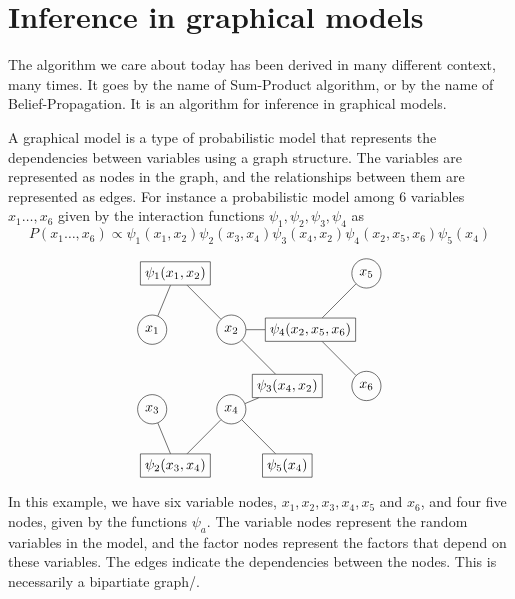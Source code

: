 \section{Inference in graphical models}

The algorithm we care about today has been derived in many different context, many times. It goes by the name of Sum-Product algorithm, or by the name of Belief-Propagation. It is an algorithm for inference in graphical models.

A graphical model is a type of probabilistic model that represents the dependencies between variables using a graph structure. The variables are represented as nodes in the graph, and the relationships between them are represented as edges. For instance a probabilistic model among 6 variables $x_1\ldots,x_6$ given by the interaction functions $\psi_1,\psi_2,\psi_3,\psi_4$ as
\[ P(x_1\ldots,x_6) \propto  \psi_1(x_1, x_2) \psi_2(x_3, x_4) \psi_3(x_4, x_2) \psi_4(x_2, x_5,x_6) \psi_5(x_4)\]

\[
\begin{tikzpicture}[node distance=2cm]
  \node[draw, circle] (x1) {$x_1$};
  \node[draw, circle, right of=x1] (x2) {$x_2$};
  \node[draw, rectangle, right of=x2] (f4) {$\psi_4(x_2, x_5,x_6)$};
  \node[draw, circle, above right of=f4] (x5) {$x_5$};
  \node[draw, circle, below right of=f4] (x6) {$x_6$};
  \node[draw, circle, below of=x1] (x3) {$x_3$};
  \node[draw, circle, below of=x2] (x4) {$x_4$};
  \node[draw, rectangle, above left of=x2] (f1) {$\psi_1(x_1, x_2)$};
  \node[draw, rectangle, below left of=x4] (f2) {$\psi_2(x_3, x_4)$};
  \node[draw, rectangle, below right of=x4 ] (f5) {$\psi_5( x_4)$};
  \node[draw, rectangle, below right of=x2] (f3) {$\psi_3(x_4, x_2)$};
  \draw[-] (x1) -- (f1);
  \draw[-] (x2) -- (f1);
  \draw[-] (x3) -- (f2);
  \draw[-] (x4) -- (f2);
  \draw[-] (x4) -- (f3);
  \draw[-] (x2) -- (f3);
  \draw[-] (x2) -- (f4);
  \draw[-] (x4) -- (f5);
  \draw[-] (x5) -- (f4);
  \draw[-] (x6) -- (f4);
\end{tikzpicture}\]
In this example, we have six variable nodes, $x_1, x_2, x_3,x_4,x_5$ and $x_6$, and four five nodes, given by the functions $\psi_a$. The variable nodes represent the random variables in the model, and the factor nodes represent the factors that depend on these variables. The edges indicate the dependencies between the nodes. This is necessarily a bipartiate graph/.

